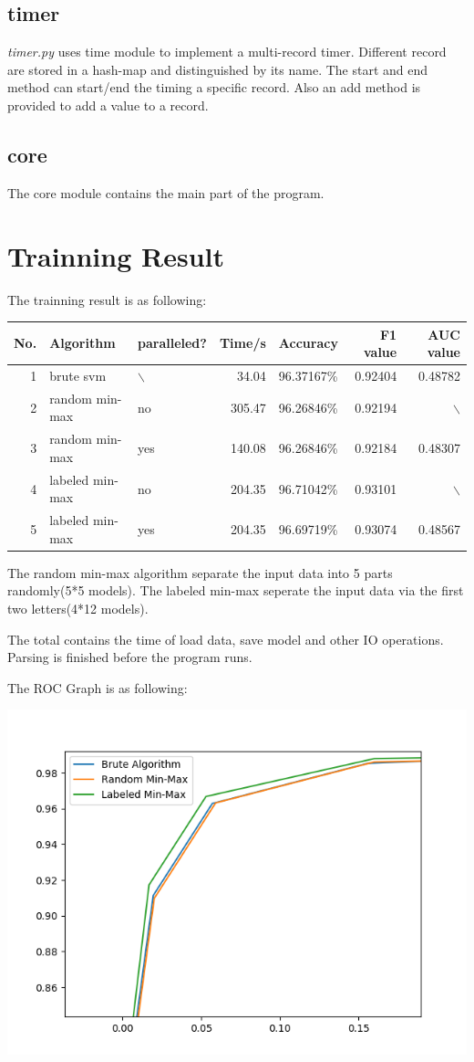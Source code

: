 \documentclass[11pt]{article}
\begin{document}
\subsection{timer}
\label{sec-1-6}
\emph{timer.py} uses time module to implement a multi-record timer. Different record
are stored in a hash-map and distinguished by its name. The start and end method
can start/end the timing a specific record. Also an add method is provided to
add a value to a record.
\subsection{core}
\label{sec-1-7}
The core module contains the main part of the program.

\section{Trainning Result}
\label{sec-2}
The trainning result is as following:
\begin{center}
\begin{tabular}{rllrlrr}
\hline
No. & Algorithm & paralleled? & Time/s & Accuracy & F1 value & AUC value\\
\hline
1 & brute svm & $\backslash$ & 34.04 & 96.37167\% & 0.92404 & 0.48782\\
2 & random min-max & no & 305.47 & 96.26846\% & 0.92194 & $\backslash$\\
3 & random min-max & yes & 140.08 & 96.26846\% & 0.92184 & 0.48307\\
4 & labeled min-max & no & 204.35 & 96.71042\% & 0.93101 & $\backslash$\\
5 & labeled min-max & yes & 204.35 & 96.69719\% & 0.93074 & 0.48567\\
\hline
\end{tabular}
\end{center}
The random min-max algorithm separate the input data into 5 parts randomly(5*5 models).
The labeled min-max seperate the input data via the first two letters(4*12 models).

The total contains the time of load data, save model and other IO operations.
Parsing is finished before the program runs.

The ROC Graph is as following:


\includegraphics[width=.9\linewidth]{figure_1.png}
\end{document}
